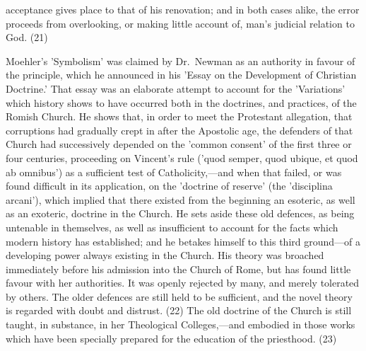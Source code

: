 \documentclass[
]{book}
\begin{document}
acceptance gives place to that of his renovation; and in both cases alike, the error proceeds from overlooking, or making little account of, man's judicial relation to God. (21)

Moehler's 'Symbolism' was claimed by Dr.~Newman as an authority in favour of the principle, which he announced in his 'Essay on the Development of Christian Doctrine.' That essay was an elaborate attempt to account for the 'Variations' which history shows to have occurred both in the doctrines, and practices, of the Romish Church. He shows that, in order to meet the Protestant allegation, that corruptions had gradually crept in after the Apostolic age, the defenders of that Church had successively depended on the 'common consent' of the first three or four centuries, proceeding on Vincent's rule ('quod semper, quod ubique, et quod ab omnibus') as a sufficient test of Catholicity,---and when that failed, or was found difficult in its application, on the 'doctrine of reserve' (the 'disciplina arcani'), which implied that there existed from the beginning an esoteric, as well as an exoteric, doctrine in the Church. He sets aside these old defences, as being untenable in themselves, as well as insufficient to account for the facts which modern history has established; and he betakes himself to this third ground---of a developing power always existing in the Church. His theory was broached immediately before his admission into the Church of Rome, but has found little favour with her authorities. It was openly rejected by many, and merely tolerated by others. The older defences are still held to be sufficient, and the novel theory is regarded with doubt and distrust. (22) The old doctrine of the Church is still taught, in substance, in her Theological Colleges,---and embodied in those works which have been specially prepared for the education of the priesthood. (23)
\end{document}
